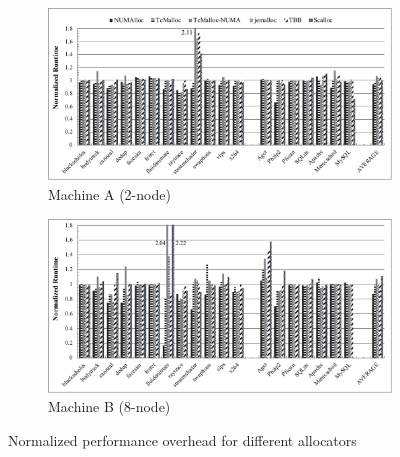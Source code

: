 

\begin{figure}[H]
    \centering
    \begin{subfigure}{0.9\textwidth}
    \includegraphics[width=\textwidth]{figure/2-node-parsec-perf.pdf}
    \caption{Machine A (2-node)\label{2node-parsec-perf}}
    \end{subfigure}
    
	\vspace{0.1in}  
	
	\begin{subfigure}{0.9\textwidth}    \includegraphics[width=\textwidth]{figure/8-node-parsec-perf.pdf}
    \caption{Machine B (8-node)\label{8node-parsec-perf}}
    \end{subfigure}
    \caption{Normalized performance overhead for different allocators \label{sec:perf}}
 \end{figure}

